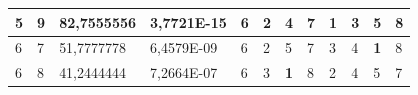\documentclass[conference]{IEEEtran}
\begin{document}
\begin{table}[]
\begin{tabular}{|llll|llllllll|}
\multicolumn{1}{|l|}{5}                                                     & \multicolumn{1}{l|}{9}                                                        & \multicolumn{1}{l|}{82,7555556}                                                   & 3,7721E-15                     & \multicolumn{1}{l|}{6}                                                  & \multicolumn{1}{l|}{2}                                                  & \multicolumn{1}{l|}{4}                                                  & \multicolumn{1}{l|}{7}                                                  & \multicolumn{1}{l|}{\textbf{1}}                                         & \multicolumn{1}{l|}{3}                                                  & \multicolumn{1}{l|}{5}                                                  & 8                          \\ \hline
\multicolumn{1}{|l|}{6}                                                     & \multicolumn{1}{l|}{7}                                                        & \multicolumn{1}{l|}{51,7777778}                                                   & 6,4579E-09                     & \multicolumn{1}{l|}{6}                                                  & \multicolumn{1}{l|}{2}                                                  & \multicolumn{1}{l|}{5}                                                  & \multicolumn{1}{l|}{7}                                                  & \multicolumn{1}{l|}{3}                                                  & \multicolumn{1}{l|}{4}                                                  & \multicolumn{1}{l|}{\textbf{1}}                                         & 8                          \\ \hline
\multicolumn{1}{|l|}{6}                                                     & \multicolumn{1}{l|}{8}                                                        & \multicolumn{1}{l|}{41,2444444}                                                   & 7,2664E-07                     & \multicolumn{1}{l|}{6}                                                  & \multicolumn{1}{l|}{3}                                                  & \multicolumn{1}{l|}{\textbf{1}}                                         & \multicolumn{1}{l|}{8}                                                  & \multicolumn{1}{l|}{2}                                                  & \multicolumn{1}{l|}{4}                                                  & \multicolumn{1}{l|}{5}                                                  & 7                          \\ \hline

\end{tabular}
\end{table}
\end{document}
